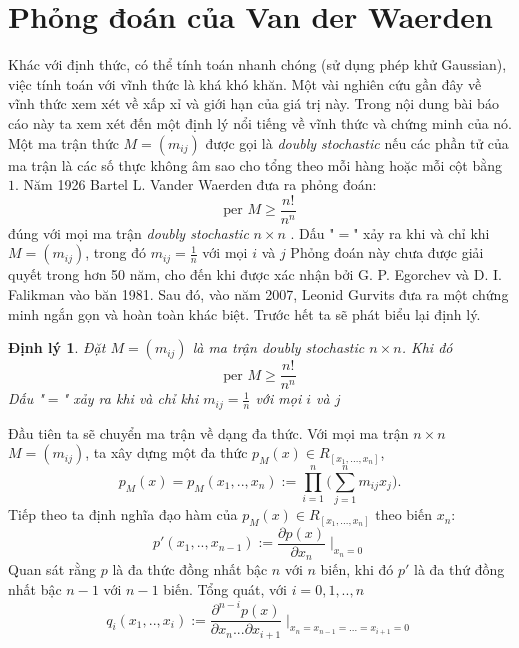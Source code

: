 \documentclass[a4paper, 12pt]{report}
\newtheorem*{theorem}{Định lý } %
\begin{document}
\section{Phỏng đoán của Van der Waerden}
Khác với định thức, có thể tính toán nhanh chóng (sử dụng phép khử Gaussian), việc tính toán với vĩnh thức là khá khó khăn. Một vài nghiên cứu gần đây về vĩnh thức xem xét về xấp xỉ và giới hạn của giá trị này. Trong nội dung bài báo cáo này ta xem xét đến một định lý nổi tiếng về vĩnh thức và chứng minh của nó. Một ma trận thức $M=(m_{ij})$ được gọi là \textit{doubly stochastic} nếu các phần tử của ma trận là các số thực không âm sao cho tổng theo mỗi hàng hoặc mỗi cột bằng $1$. Năm 1926 Bartel L. Vander Waerden đưa ra phỏng đoán: 
\begin{equation*}
\textrm{per } M \geq \frac{n!}{n^n}
\end{equation*}
đúng với mọi ma trận \textit{doubly stochastic} $n \times n $ . Dấu "$=$" xảy ra khi và chỉ khi $M=(m_{ij})$, trong đó $m_{ij} = \frac{1}{n}$ với mọi $i$ và $j$
Phỏng đoán này chưa được giải quyết trong hơn 50 năm, cho đến khi được xác nhận bởi G. P. Egorchev và D. I. Falikman vào băn 1981. Sau đó, vào năm 2007, Leonid Gurvits đưa ra một chứng minh ngắn gọn và hoàn toàn khác biệt. Trước hết ta sẽ phát biểu lại định lý.
\begin{theorem}
Đặt $M=(m_{ij})$ là ma trận \textit{doubly stochastic} $n \times n $. Khi đó
\begin{equation}
\textrm{per } M \geq \frac{n!}{n^n} \label{eqPer}
\end{equation}
Dấu "$=$" xảy ra khi và chỉ khi  $m_{ij} = \frac{1}{n}$ với mọi $i$ và $j$
\end{theorem}
Đầu tiên ta sẽ chuyển ma trận về dạng đa thức. Với mọi ma trận $n  \times n$ $M = (m_{ij}) $, ta xây dựng một đa thức $p_M(x) \in R_{[x_1,...,x_n]} $, 
\begin{equation*}
	p_M(x) = p_M(x_1,..,x_n) := \displaystyle \prod_{i=1}^{n} \Big( \displaystyle \sum_{j=1}^{n} m_{ij}x_j \Big).
\end{equation*}
Tiếp theo ta định nghĩa đạo hàm của $p_M(x) \in R_{[x_1,...,x_n]} $  theo biến $x_n$:
\begin{equation*}
	 p'(x_1,..,x_{n-1}) := \frac{\partial p(x)}{\partial x_n}\mid _{x_n = 0}
\end{equation*}
Quan sát rằng $p$ là đa thức đồng nhất bậc $n$ với $n$ biến, khi đó $p'$ là đa thứ đồng nhất bậc $n-1$ với $n-1$ biến. Tổng quát, với $i=0,1,..,n$
\begin{equation*}
	 q_i(x_1,..,x_{i}) := \frac{\partial^{n-i} p(x)}{\partial x_n...\partial x_{i+1}}\mid _{x_n = x_{n-1} = ... = x_{i+1} = 0}
\end{equation*}
\end{document}
